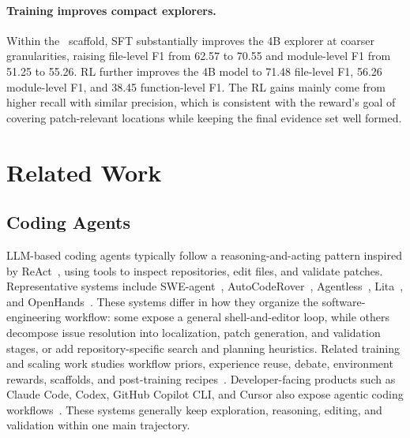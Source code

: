 \documentclass{llmxive}
\providecommand{\approach}{~}
\begin{document}
\paragraph{Training improves compact explorers.}
Within the \approach scaffold, SFT substantially improves the 4B explorer at coarser granularities, raising file-level F1 from 62.57 to 70.55 and module-level F1 from 51.25 to 55.26.
RL further improves the 4B model to 71.48 file-level F1, 56.26 module-level F1, and 38.45 function-level F1.
The RL gains mainly come from higher recall with similar precision, which is consistent with the reward's goal of covering patch-relevant locations while keeping the final evidence set well formed.

\section{Related Work}
\label{sec:related}

\subsection{Coding Agents}

LLM-based coding agents typically follow a reasoning-and-acting pattern inspired by ReAct~\cite{react}, using tools to inspect repositories, edit files, and validate patches.
Representative systems include SWE-agent~\cite{sweagent}, AutoCodeRover~\cite{autocoderover}, Agentless~\cite{agentless}, Lita~\cite{lita}, and OpenHands~\cite{openhands}.
These systems differ in how they organize the software-engineering workflow: some expose a general shell-and-editor loop, while others decompose issue resolution into localization, patch generation, and validation stages, or add repository-specific search and planning heuristics.
Related training and scaling work studies workflow priors, experience reuse, debate, environment rewards, scaffolds, and post-training recipes~\cite{kimidev, swefixer, swegym, sweexp, swedebate, agentrlvr, slime_github, hyperagent, sweprotege, sweworld, swemaster}.
Developer-facing products such as Claude Code, Codex, GitHub Copilot CLI, and Cursor also expose agentic coding workflows~\cite{claudecode, openaicodex, githubcopilotcli, cursor}.
These systems generally keep exploration, reasoning, editing, and validation within one main trajectory.
\end{document}
